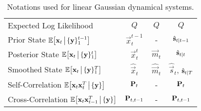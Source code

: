 \begin{table}[ht]
\begin{tabular}{l|ccc}
		Expected Log Likelihood      & \( Q \)                         & \( Q \)                 & \( Q \)                                                    \\
		Prior State \( \mathbb{E}\big[ \boldsymbol{\mathrm{x}}_t \,\big\vert\, \{ \boldsymbol{\mathrm{y}} \}_1^{t - 1} \big] \)
		                             & \( \vec{x}_t^{t - 1} \)         & -                       & \( \hat{\boldsymbol{\mathrm{s}}}_{t \vert t - 1} \)                    \\
		Posterior State \( \mathbb{E}\big[ \boldsymbol{\mathrm{x}}_t \,\big\vert\, \{ \boldsymbol{\mathrm{y}} \}_1^t \big] \)
		                             & \( \vec{x}_t^t \)               & \( \vec{m}_t \)         & \( \hat{\boldsymbol{\mathrm{s}}}_{t \vert t} \)                        \\
		Smoothed State \( \mathbb{E}\big[\boldsymbol{\mathrm{x}}_t \,\big\vert\, \{ \boldsymbol{\mathrm{y}} \}_1^T\big] \)
		                             & \( \hat{\vec{x}}_t \)           & \( \hat{\vec{m}}_t \)   & \( \hat{\vec{s}}_t \), \( \hat{\boldsymbol{\mathrm{s}}}_{t \vert T} \) \\
		Self-Correlation \( \mathbb{E}\big[\boldsymbol{\mathrm{x}}_t \boldsymbol{\mathrm{x}}_t^T \,\big\vert\, \{ \boldsymbol{\mathrm{y}} \}\big] \)
		                             & \( \boldsymbol{\mathrm{P}}_t \)                 & -                       & \( \boldsymbol{\mathrm{P}}_t \)                                            \\
		Cross-Correlation \( \mathbb{E}\big[\boldsymbol{\mathrm{x}}_t \boldsymbol{\mathrm{x}}_{t-1}^T \,\big\vert\, \{ \boldsymbol{\mathrm{y}} \}\big] \)
		                             & \( \boldsymbol{\mathrm{P}}_{t, t - 1} \)        & -                       & \( \boldsymbol{\mathrm{P}}_{t, t - 1} \)
	\end{tabular}
	\caption{Notations used for linear Gaussian dynamical systems.}
\end{table}
